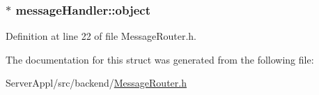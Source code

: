 \subsubsection[{object}]{$\ast$ message\+Handler\+::object}\label{structmessage_handler_a19e36429d315bc4d38639035be25d257}


Definition at line 22 of file Message\+Router.\+h.



The documentation for this struct was generated from the following file\+:\begin{DoxyCompactItemize}
\item 
Server\+Appl/src/backend/\hyperlink{_message_router_8h}{Message\+Router.\+h}\end{DoxyCompactItemize}

